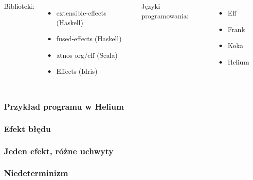 
\begin{frame}
  \frametitle{}
  \begin{columns}
    \column{.4\paperwidth}
    Biblioteki:
    \begin{itemize}
      \item extensible-effects (Haskell)
      \item fused-effects (Haskell)
      \item atnos-org/eff (Scala)
      \item Effects (Idris)
    \end{itemize}
    \column{.4\paperwidth}
    Języki programowania:
    \begin{itemize}
      \item Eff
      \item Frank
      \item Koka
      \item Helium
    \end{itemize}
  \end{columns}
\end{frame}

\newcommand{\inl}[1]{\lstinline[style=Haleff-inl]{#1}}
\lstset{language=Haleff, showstringspaces=false, inputpath=../thesis/code_examples}

\begin{frame}
  \frametitle{Przykład programu w Helium}
  
\end{frame}

\begin{frame}
  \frametitle{Efekt błędu}
  
  
\end{frame}

\begin{frame}
  \frametitle{Jeden efekt, różne uchwyty}
  
  
\end{frame}

\begin{frame}
  \frametitle{Niedeterminizm}
  
  \begin{columns}
    \column{.455\paperwidth}
    
    \column{.455\paperwidth}
    
  \end{columns}
  
\end{frame}

